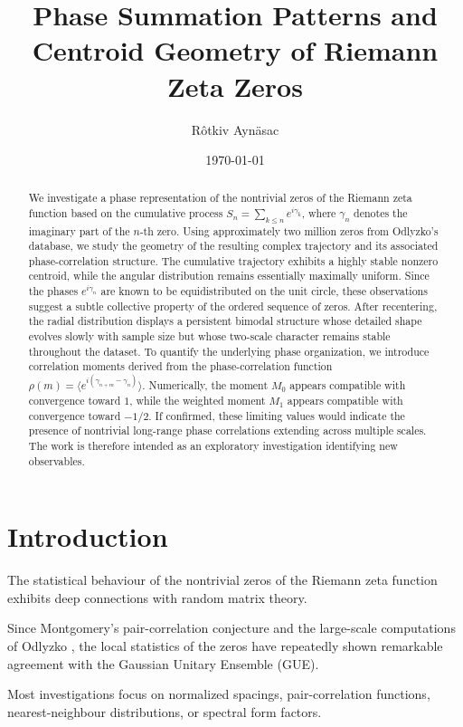 \documentclass[11pt]{amsart}
\title{Phase Summation Patterns and Centroid Geometry of Riemann Zeta Zeros}
\author{Rôtkiv Aynäsac}
\date{\today}
\theoremstyle{definition}
\theoremstyle{remark}
\begin{document}
\begin{abstract}


We investigate a phase representation of the nontrivial zeros of the Riemann zeta function based on the cumulative process \(S_n=\sum_{k\le n} e^{i\gamma_k}\), where \(\gamma_n\) denotes the imaginary part of the \(n\)-th zero. Using approximately two million zeros from Odlyzko's database, we study the geometry of the resulting complex trajectory and its associated phase-correlation structure. The cumulative trajectory exhibits a highly stable nonzero centroid, while the angular distribution remains essentially maximally uniform. Since the phases \(e^{i\gamma_n}\) are known to be equidistributed on the unit circle, these observations suggest a subtle collective property of the ordered sequence of zeros. After recentering, the radial distribution displays a persistent bimodal structure whose detailed shape evolves slowly with sample size but whose two-scale character remains stable throughout the dataset. To quantify the underlying phase organization, we introduce correlation moments derived from the phase-correlation function \(\rho(m)=\langle e^{i(\gamma_{n+m}-\gamma_n)}\rangle\). Numerically, the moment \(M_0\) appears compatible with convergence toward \(1\), while the weighted moment \(M_1\) appears compatible with convergence toward \(-1/2\). If confirmed, these limiting values would indicate the presence of nontrivial long-range phase correlations extending across multiple scales. The work is therefore intended as an exploratory investigation identifying new observables.


\end{abstract}

\maketitle
\section{Introduction}

The statistical behaviour of the nontrivial zeros of the
Riemann zeta function exhibits deep connections with
random matrix theory.

Since Montgomery's pair-correlation conjecture
\cite{Montgomery}
and the large-scale computations of Odlyzko
\cite{Odlyzko},
the local statistics of the zeros have repeatedly shown
remarkable agreement with the Gaussian Unitary Ensemble
(GUE).

Most investigations focus on normalized spacings,
pair-correlation functions,
nearest-neighbour distributions,
or spectral form factors.
\end{document}
